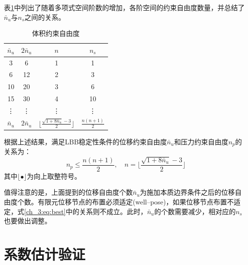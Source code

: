 表\ref{ch_3:tab:constraint}中列出了随着多项式空间阶数的增加，各阶空间的约束自由度数量，并总结了$\bar{n}_u$与$n_s$之间的关系。
\begin{table}[!h]
    \centering
    \caption{体积约束自由度}\label{ch_3:tab:constraint}
    \setlength{\tabcolsep}{10mm}
    \renewcommand{\arraystretch}{2}
    \begin{tabular}{cccc}
        \toprule
            $\bar{n}_u$ & $2\bar{n}_u$ & $n$ &$ n_s$\\
        \midrule
        3  & 6  & 1 & 1 \\
        6  & 12 & 2 & 3 \\
        10 & 20 & 3 & 6 \\
        15 & 30 & 4 & 10 \\
        \vdots & \vdots & \vdots & \vdots \\
        $\bar{n}_u$ & $2\bar{n}_u$ & $\lfloor\frac{\sqrt{1+8\bar{n}_u}-3}{2}\rfloor$ & $\frac{n(n+1)}{2}$  \\
        \bottomrule
    \end{tabular}
\end{table}

根据上述结果，满足LBB稳定性条件的位移约束自由度$\bar{n}_u$和压力约束自由度$n_p$的关系为：
\begin{equation}\label{ch_3:eq:best}
n_p\leq \frac{n(n+1)}{2},\quad n = \lfloor\frac{\sqrt{1+8\bar{n}_u}-3}{2}\rfloor
\end{equation}
其中$\lfloor\bullet\rfloor$为向上取整符号。

值得注意的是，上面提到的位移自由度个数$\bar{n}_u$为施加本质边界条件之后的位移自由度个数。有限元位移节点的布置必须适定(well--pose)，如果位移节点布置不适定，式\eqref{ch_3:eq:best}中的关系则不成立。此时，$\bar{n}_u$的个数需要减少，相对应的$n_s$也要做出调整。
\section{系数估计验证}

